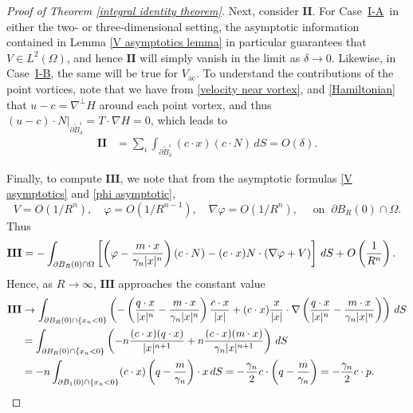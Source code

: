 \documentclass[11pt,reqno]{amsart}
\newcommand{\NS}{\texorpdfstring{\hyperref[sec non-singular]{I-A}}{I-A}}
\newcommand{\PV}{\texorpdfstring{\hyperref[sec point]{I-B}}{I-B}}
\theoremstyle{plain}
\theoremstyle{remark}
\numberwithin{equation}{section}
\begin{document}
\begin{proof}[Proof of Theorem \ref{integral identity theorem}]
Next, consider $\mathbf{II}$.  For Case~\NS\ in either the two- or three-dimensional setting, the asymptotic information contained in Lemma \ref{V asymptotics lemma} in particular guarantees that $V \in L^2(\Omega)$, and hence $\mathbf{II}$ will simply vanish in the limit as $\delta \to 0$.  Likewise, in Case~\PV, the same will be true for  $V_{\mathrm{ac}}$.  To understand the contributions of the point vortices, note that we have from \eqref{velocity near vortex}, and \eqref{Hamiltonian} that $u - c = \nabla^\perp H$ around each point vortex, and thus $(u - c) \cdot N |_{\partial \tilde B^i_\delta} = T \cdot \nabla H = 0$, which leads to 
\begin{align*}
\mathbf{II} & = \sum_i \int_{\partial \tilde B^i_\delta} (c \cdot x) (c  \cdot N ) \, dS 
 = O(\delta).
 \end{align*}
  
Finally, to compute $\mathbf{III}$, we note that from the asymptotic formulas \eqref{V asymptotics} and \eqref{phi asymptotic},
\[
V = O(1/R^n), \quad \varphi = O(1/R^{n-1}), \quad \nabla \varphi = O(1/R^n), \quad \text{ on }\ \partial B_R(0) \cap \Omega.
\]
Thus
\begin{align*}
\mathbf{III} & = -\int_{\partial B_R(0) \cap \Omega} \left[ \left( \varphi - {m \cdot x\over \gamma_n |x|^n}  \right) (c \cdot N) - (c \cdot x) N \cdot ( \nabla \varphi + V)  \right] \, dS  + O\left(\frac{1}{R^n} \right).
\end{align*} 
Hence, as $R \to \infty$, $\mathbf{III}$ approaches the constant value 
\begin{align*} 
\mathbf{III} & \to \int_{\partial B_R(0) \cap \{ x_n < 0 \}} \left( -\left(\frac{q \cdot x}{|x|^n} - {m \cdot x\over \gamma_n |x|^n} \right) \frac{c \cdot x}{|x|} + (c \cdot x) \frac{x}{|x|} \cdot \nabla \left( \frac{q \cdot x}{|x|^n} - \frac{m \cdot x}{\gamma_n |x|^n}   \right) \right) \, dS    \\ 
& =   \int_{\partial B_R(0) \cap \{ x_n < 0 \}} \left( -n  \frac{(c \cdot x) (q \cdot x) }{|x|^{n+1}} + n  \frac{(c \cdot x)(m \cdot x)}{\gamma_n |x|^{n+1}}  \right)  \, dS  \\
& = -n \int_{\partial B_1(0) \cap \{x_n < 0\}} (c \cdot x) \left( q - \frac{m}{\gamma_n}  \right) \cdot x \, dS =   -\frac{\gamma_n}{2}  c \cdot \left( q - \frac{m}{\gamma_n }  \right)  = -\frac{\gamma_n}{2}  c \cdot p.
\end{align*}  


\end{proof}
\end{document}
